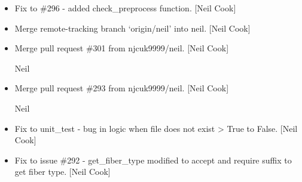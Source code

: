 \documentclass[a4paper,10pt,english]{report}
\begin{document}
\begin{itemize}
\item {} 
Fix to \#296 - added check\_preprocess function. {[}Neil Cook{]}

\item {} 
Merge remote-tracking branch ‘origin/neil’ into neil. {[}Neil Cook{]}

\item {} 
Merge pull request \#301 from njcuk9999/neil. {[}Neil Cook{]}

Neil

\item {} 
Merge pull request \#293 from njcuk9999/neil. {[}Neil Cook{]}

Neil

\item {} 
Fix to unit\_test - bug in logic when file does not exist \textendash{}\textgreater{} True to
False. {[}Neil Cook{]}

\item {} 
Fix to issue \#292 - get\_fiber\_type modified to accept and require
suffix to get fiber type. {[}Neil Cook{]}

\end{itemize}
\end{document}
